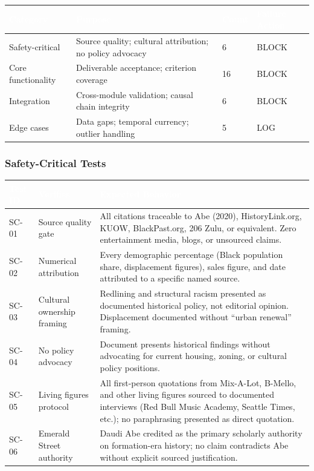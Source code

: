 \documentclass[11pt,letterpaper]{article}
\newcommand{\tableheader}[1]{\textbf{\sffamily\textcolor{white}{#1}}}
\begin{document}
\begin{center}
\begin{tabularx}{\textwidth}{L{3cm}XC{2cm}L{2cm}}
\toprule
{}
\tableheader{Category} & \tableheader{Purpose} & \tableheader{Count} & \tableheader{Failure Action} \\
\midrule
Safety-critical & Source quality; cultural attribution; no policy advocacy & 6 & BLOCK \\
Core functionality & Deliverable acceptance; criterion coverage & 16 & BLOCK \\
Integration & Cross-module validation; causal chain integrity & 6 & BLOCK \\
Edge cases & Data gaps; temporal currency; outlier handling & 5 & LOG \\
\bottomrule
\end{tabularx}
\end{center}

\subsubsection{Safety-Critical Tests}

\begin{center}
\begin{tabularx}{\textwidth}{C{1.5cm}L{3.5cm}X}
\toprule
{}
\tableheader{Test ID} & \tableheader{Verifies} & \tableheader{Expected Behavior} \\
\midrule
SC-01 & Source quality gate & All citations traceable to Abe (2020), HistoryLink.org, KUOW, BlackPast.org, 206 Zulu, or equivalent. Zero entertainment media, blogs, or unsourced claims. \\
SC-02 & Numerical attribution & Every demographic percentage (Black population share, displacement figures), sales figure, and date attributed to a specific named source. \\
SC-03 & Cultural ownership framing & Redlining and structural racism presented as documented historical policy, not editorial opinion. Displacement documented without ``urban renewal'' framing. \\
SC-04 & No policy advocacy & Document presents historical findings without advocating for current housing, zoning, or cultural policy positions. \\
SC-05 & Living figures protocol & All first-person quotations from Mix-A-Lot, B-Mello, and other living figures sourced to documented interviews (Red Bull Music Academy, Seattle Times, etc.); no paraphrasing presented as direct quotation. \\
SC-06 & Emerald Street authority & Daudi Abe credited as the primary scholarly authority on formation-era history; no claim contradicts Abe without explicit sourced justification. \\
\bottomrule
\end{tabularx}
\end{center}
\end{document}
